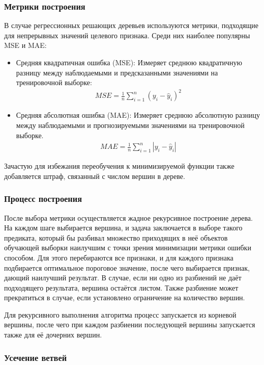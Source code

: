 \subsubsection{Метрики построения}
В случае регрессионных решающих деревьев используются метрики, подходящие для непрерывных значений целевого признака. Среди них наиболее популярны MSE и MAE:
\begin{itemize}
    \item  Средняя квадратичная ошибка (MSE): Измеряет среднюю квадратичную разницу между наблюдаемыми и предсказанными значениями на тренировочной выборке:
    \begin{align*}
        MSE = \frac{1}{n} \sum_{i=1}^{n} (y_i - \hat{y}_i)^2
    \end{align*} 
    \item Средняя абсолютная ошибка (MAE): Измеряет среднюю абсолютную разницу между наблюдаемыми и прогнозируемыми значениями на тренировочной выборке.
    \begin{align*}
        MAE = \frac{1}{n} \sum_{i=1}^{n} |y_i - \hat{y}_i|
    \end{align*}
\end{itemize}

Зачастую для избежания переобучения к минимизируемой функции также добавляется штраф, связанный с числом вершин в дереве.

\subsubsection{Процесс построения}
После выбора метрики осуществляется жадное рекурсивное построение дерева. На каждом шаге выбирается вершина, и задача заключается в выборе такого предиката, который бы разбивал множество приходящих в неё объектов обучающей выборки наилучшим с точки зрения минимизации метрики ошибки способом. Для этого перебираются все признаки, и для каждого признака подбирается оптимальное пороговое значение, после чего выбирается признак, дающий наилучший результат. В случае, если ни одно из разбиений не даёт подходящего результата, вершина остаётся листом. Также разбиение может прекратиться в случае, если установлено ограничение на количество вершин.

Для рекурсивного выполнения алгоритма процесс запускается из корневой вершины, после чего при каждом разбиении последующей вершины запускается также для её дочерних вершин.

\subsubsection{Усечение ветвей}

